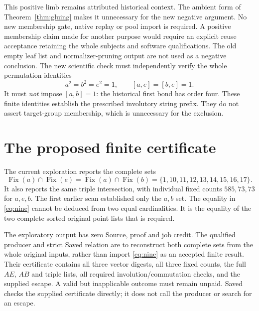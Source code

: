 \documentclass[11pt]{article}
\newcommand{\Fix}{\operatorname{Fix}}
\begin{document}
This positive limb remains attributed historical context. The ambient
form of Theorem~\ref{thm:gluing} makes it unnecessary for the new
negative argument. No new membership gate, native replay or pool
import is required. A positive membership claim made for another
purpose would require an explicit reuse acceptance retaining the
whole subjects and software qualifications. The old empty leaf list
and normalizer-pruning output are not used as a negative conclusion.
The new scientific check must
independently verify the whole permutation identities
\[
 a^2=b^2=e^2=1,\qquad [a,e]=[b,e]=1.
\]
It must \emph{not} impose $[a,b]=1$: the historical first bond
has order four. These finite identities establish the prescribed
involutory string prefix. They do not assert target-group membership,
which is unnecessary for the exclusion.

\section{The proposed finite certificate}

The current exploration reports the complete sets
\begin{equation}\label{eq:nine}
 \Fix(a)\cap\Fix(e)=\Fix(a)\cap\Fix(b)
       =\{1,10,11,12,13,14,15,16,17\}.
\end{equation}
It also reports the same triple intersection, with individual fixed
counts $585,73,73$ for $a,e,b$. The first earlier scan established
only the $a,b$ set. The equality in \eqref{eq:nine} cannot be
deduced from two equal cardinalities. It is the equality of the two
complete sorted original point lists that is required.

The exploratory output has zero Source, proof and job credit. The
qualified producer and strict Saved relation are to reconstruct both
complete sets from the whole original inputs, rather than import
\eqref{eq:nine} as an accepted finite result. Their certificate
contains all three vector digests, all three fixed counts, the full
$AE$, $AB$ and triple lists, all required involution/commutation
checks, and the supplied escape. A valid but inapplicable outcome
must remain unpaid. Saved checks the supplied certificate directly;
it does not call the producer or search for an escape.
\end{document}
